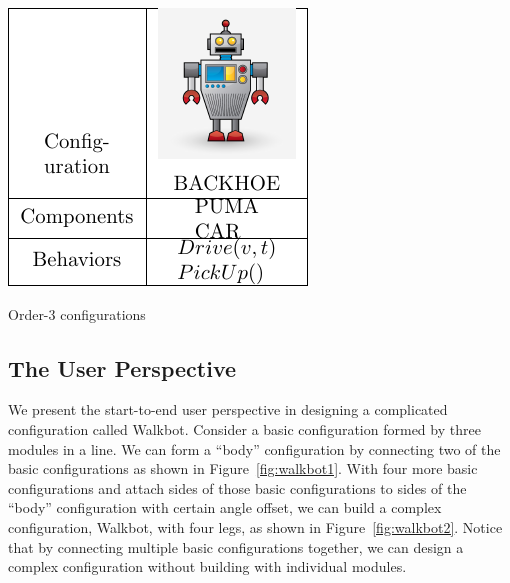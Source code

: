 \documentclass[conference]{IEEEtran}
\theoremstyle{definition}
\begin{document}
\begin{table}
    \begin{center}
        \includegraphics[scale=1]{images/library/tier3.pdf}
        \caption{Order-3 configurations}
        \label{Order-3-configurations}
    \end{center}
\end{table}

\subsection{The User Perspective}
We present the start-to-end user perspective in designing a complicated configuration called Walkbot. Consider a basic configuration formed by three modules in a line. We can form a ``body'' configuration by connecting two of the basic configurations as shown in Figure~\ref{fig:walkbot1}. With four more basic configurations and attach sides of those basic configurations to sides of the ``body'' configuration with certain angle offset, we can build a complex configuration, Walkbot, with four legs, as shown in Figure~\ref{fig:walkbot2}. Notice that by connecting multiple  basic configurations together, we can design a complex configuration without building with individual modules.
\end{document}

